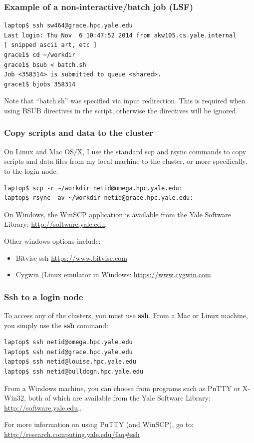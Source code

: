 \documentclass[10pt]{beamer}
\begin{document}
\begin{frame}[fragile]
\frametitle{Example of a non-interactive/batch job (LSF)}
\begin{verbatim}
laptop$ ssh sw464@grace.hpc.yale.edu
Last login: Thu Nov  6 10:47:52 2014 from akw105.cs.yale.internal
[ snipped ascii art, etc ]
grace1$ cd ~/workdir
grace1$ bsub < batch.sh
Job <358314> is submitted to queue <shared>.
grace1$ bjobs 358314
\end{verbatim}

\vskip14pt
Note that ``batch.sh'' was specified via input redirection.
This is required when using BSUB directives in the script,
otherwise the directives will be ignored.
\end{frame}


\begin{frame}[fragile]
\frametitle{Copy scripts and data to the cluster}
On Linux and Mac OS/X, I use the standard scp and rsync commands
to copy scripts and data files from my local machine to the cluster,
or more specifically, to the login node.

\begin{verbatim}
laptop$ scp -r ~/workdir netid@omega.hpc.yale.edu:
laptop$ rsync -av ~/workdir netid@grace.hpc.yale.edu:
\end{verbatim}

On Windows, the WinSCP application is available from the Yale Software
Library: \url{http://software.yale.edu}.

\vskip10pt
Other windows options include:

\begin{itemize}
\item{Bitvise ssh \url{https://www.bitvise.com}}
\item{Cygwin (Linux emulator in Windows: \url{https://www.cygwin.com}}
\end{itemize}

\end{frame}

\begin{frame}[fragile]
\frametitle{Ssh to a login node}
To access any of the clusters, you must use \textbf{ssh}.
From a Mac or Linux machine, you simply use the \textbf{ssh} command:

\begin{verbatim}
laptop$ ssh netid@omega.hpc.yale.edu
laptop$ ssh netid@grace.hpc.yale.edu
laptop$ ssh netid@louise.hpc.yale.edu
laptop$ ssh netid@bulldogn.hpc.yale.edu
\end{verbatim}

From a Windows machine, you can choose from programs such as PuTTY or
X-Win32, both of which are available from the Yale Software Library:
\url{http://software.yale.edu}..

\vskip10pt
For more information on using PuTTY (and WinSCP), go to:
\url{http://research.computing.yale.edu/faq\#ssh}
\end{frame}
\end{document}
